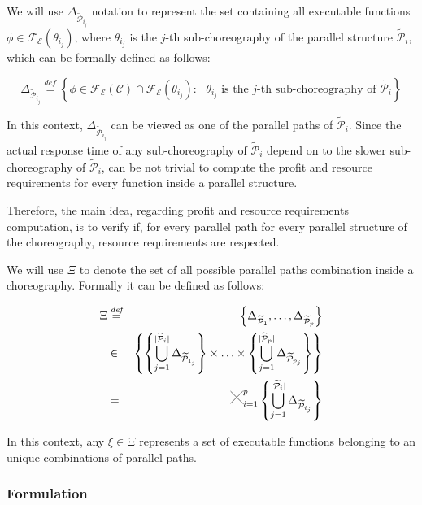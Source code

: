 \documentclass[12pt,a4paper]{report}
\newcommand{\Cross}{\mathbin{\tikz [x=2.5ex,y=2.5ex,line width=.10ex] \draw (0,0) -- (1,1) (0,1) -- (1,0);}}
\newcommand{\mathDef}{\overset{\textit{def}}{=}}
\theoremstyle{definition}
\begin{document}
We will use $\Delta_{\mathcal{\widetilde{P}}_{i_j}}$ notation to represent the set containing all executable functions $\phi \in \mathscr{F_E}(\theta_{i_j})$, where $\theta_{i_j}$ is the $j$-th sub-choreography of the parallel structure $\mathcal{\widetilde{P}}_i$, which can be formally defined as follows:

\begin{equation}
	\Delta_{\mathcal{\widetilde{P}}_{i_j}} \mathDef \left\{ \phi \in \mathscr{F_E}(\mathcal{C}) \cap \mathscr{F_E}(\theta_{i_j}) : \text{  $\theta_{i_j}$ is the $j$-th sub-choreography of } \mathcal{\widetilde{P}}_i \right\} 
\end{equation}

In this context, $\Delta_{\mathcal{\widetilde{P}}_{i_j}}$ can be viewed as one of the parallel paths of $\mathcal{\widetilde{P}}_i$. Since the actual response time of any sub-choreography of $\mathcal{\widetilde{P}}_i$ depend on to the slower sub-choreography of $\mathcal{\widetilde{P}}_i$, can be not trivial to compute the profit and resource requirements for every function inside a parallel structure.  

Therefore, the main idea, regarding profit and resource requirements computation, is to verify if, for every parallel path for every parallel structure of the choreography, resource requirements are respected. 

We will use $\Xi$ to denote the set of all possible parallel paths combination inside a choreography. Formally it can be defined as follows: 

\begin{eqnarray}
	\Xi & \mathDef & \left\lbrace \Delta_{\mathcal{\widetilde{P}}_{1}}, \ldots, \Delta_{\mathcal{\widetilde{P}}_{p}} \right\rbrace \nonumber \\ 
	& \in & \left\{  \left\{ \bigcup_{j=1}^{|\mathcal{\widetilde{P}}_i|} \Delta_{\mathcal{\widetilde{P}}_{1_j}} \right\} \times \ldots \times \left\{ \bigcup_{j=1}^{|\mathcal{\widetilde{P}}_p|} \Delta_{\mathcal{\widetilde{P}}_{p_j}} \right\} \right\}  \nonumber \\
	& = & \Cross_{i = 1}^p  \left\{ \bigcup_{j=1}^{|\mathcal{\widetilde{P}}_i|} \Delta_{\mathcal{\widetilde{P}}_{i_j}} \right\}  \nonumber \\
\end{eqnarray}

In this context, any $\xi \in \Xi$ represents a set of executable functions belonging to an unique combinations of parallel paths.

\subsubsection{Formulation}
\end{document}
